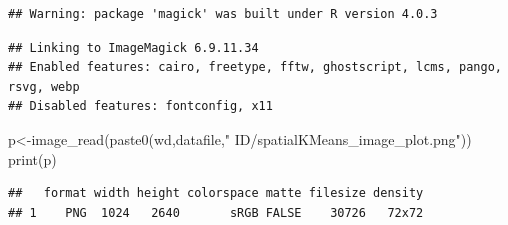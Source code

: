 \documentclass[
]{article}
\newenvironment{Shaded}{\begin{snugshade}}{\end{snugshade}}
\newcommand{\FunctionTok}[1]{\textcolor[rgb]{0.00,0.00,0.00}{#1}}
\newcommand{\NormalTok}[1]{#1}
\newcommand{\OtherTok}[1]{\textcolor[rgb]{0.56,0.35,0.01}{#1}}
\newcommand{\StringTok}[1]{\textcolor[rgb]{0.31,0.60,0.02}{#1}}
\begin{document}
\begin{verbatim}
## Warning: package 'magick' was built under R version 4.0.3
\end{verbatim}

\begin{verbatim}
## Linking to ImageMagick 6.9.11.34
## Enabled features: cairo, freetype, fftw, ghostscript, lcms, pango, rsvg, webp
## Disabled features: fontconfig, x11
\end{verbatim}

\begin{Shaded}
\begin{Highlighting}[]
\NormalTok{p}\OtherTok{\textless{}{-}}\FunctionTok{image\_read}\NormalTok{(}\FunctionTok{paste0}\NormalTok{(wd,datafile,}\StringTok{" ID/spatialKMeans\_image\_plot.png"}\NormalTok{))}
\FunctionTok{print}\NormalTok{(p)}
\end{Highlighting}
\end{Shaded}

\begin{verbatim}
##   format width height colorspace matte filesize density
## 1    PNG  1024   2640       sRGB FALSE    30726   72x72
\end{verbatim}
\end{document}
